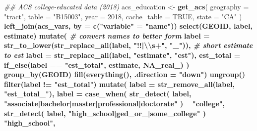 \documentclass[
]{article}
\newenvironment{Shaded}{\begin{snugshade}}{\end{snugshade}}
\newcommand{\CharTok}[1]{\textcolor[rgb]{0.31,0.60,0.02}{#1}}
\newcommand{\CommentTok}[1]{\textcolor[rgb]{0.56,0.35,0.01}{\textit{#1}}}
\newcommand{\DataTypeTok}[1]{\textcolor[rgb]{0.13,0.29,0.53}{#1}}
\newcommand{\DecValTok}[1]{\textcolor[rgb]{0.00,0.00,0.81}{#1}}
\newcommand{\KeywordTok}[1]{\textcolor[rgb]{0.13,0.29,0.53}{\textbf{#1}}}
\newcommand{\NormalTok}[1]{#1}
\newcommand{\OperatorTok}[1]{\textcolor[rgb]{0.81,0.36,0.00}{\textbf{#1}}}
\newcommand{\OtherTok}[1]{\textcolor[rgb]{0.56,0.35,0.01}{#1}}
\newcommand{\StringTok}[1]{\textcolor[rgb]{0.31,0.60,0.02}{#1}}
\begin{document}
\begin{Shaded}
\begin{Highlighting}[]
{{{{{{{{{{{{{{{{{{{{{{{{{{{{{{{{{{{{{{{{{{{{{{{{\CommentTok{## ACS college-educated data (2018)}
\NormalTok{acs_education <-}
\StringTok{  }\KeywordTok{get_acs}\NormalTok{(}
    \DataTypeTok{geography =} \StringTok{"tract"}\NormalTok{,}
    \DataTypeTok{table =} \StringTok{"B15003"}\NormalTok{,}
    \DataTypeTok{year =} \DecValTok{2018}\NormalTok{,}
    \DataTypeTok{cache_table =} \OtherTok{TRUE}\NormalTok{,}
    \DataTypeTok{state =} \StringTok{"CA"}
\NormalTok{  ) }\OperatorTok{%>%}
\StringTok{  }\KeywordTok{left_join}\NormalTok{(acs_vars, }\DataTypeTok{by =} \KeywordTok{c}\NormalTok{(}\StringTok{"variable"}\NormalTok{ =}\StringTok{ "name"}\NormalTok{)) }\OperatorTok{%>%}
\StringTok{  }\KeywordTok{select}\NormalTok{(GEOID, label, estimate) }\OperatorTok{%>%}
\StringTok{  }\KeywordTok{mutate}\NormalTok{(}
    \CommentTok{# convert names to better form}
    \DataTypeTok{label =} \KeywordTok{str_to_lower}\NormalTok{(}\KeywordTok{str_replace_all}\NormalTok{(label, }\StringTok{"!!|}\CharTok{\textbackslash{}\textbackslash{}}\StringTok{s+"}\NormalTok{, }\StringTok{"_"}\NormalTok{)),}
    \CommentTok{# short estimate to est}
    \DataTypeTok{label =} \KeywordTok{str_replace_all}\NormalTok{(label, }\StringTok{"estimate"}\NormalTok{, }\StringTok{"est"}\NormalTok{),}
    \DataTypeTok{est_total =} \KeywordTok{if_else}\NormalTok{(label }\OperatorTok{==}\StringTok{ "est_total"}\NormalTok{, estimate, }\OtherTok{NA_real_}\NormalTok{)}
\NormalTok{  ) }\OperatorTok{%>%}
\StringTok{  }\KeywordTok{group_by}\NormalTok{(GEOID) }\OperatorTok{%>%}
\StringTok{  }\KeywordTok{fill}\NormalTok{(}\KeywordTok{everything}\NormalTok{(), }\DataTypeTok{.direction =} \StringTok{"down"}\NormalTok{) }\OperatorTok{%>%}
\StringTok{  }\KeywordTok{ungroup}\NormalTok{() }\OperatorTok{%>%}
\StringTok{  }\KeywordTok{filter}\NormalTok{(label }\OperatorTok{!=}\StringTok{ "est_total"}\NormalTok{) }\OperatorTok{%>%}
\StringTok{  }\KeywordTok{mutate}\NormalTok{(}
    \DataTypeTok{label =} \KeywordTok{str_remove_all}\NormalTok{(label, }\StringTok{"est_total_"}\NormalTok{),}
    \DataTypeTok{label =}
      \KeywordTok{case_when}\NormalTok{(}
        \KeywordTok{str_detect}\NormalTok{(}
\NormalTok{          label, }\StringTok{"associate|bachelor|master|professional|doctorate"}
\NormalTok{        )                                                           }\OperatorTok{~}\StringTok{ "college"}\NormalTok{,}
        \KeywordTok{str_detect}\NormalTok{(}
\NormalTok{          label, }\StringTok{"high_school|ged_or_|some_college"}
\NormalTok{        )                                                       }\OperatorTok{~}\StringTok{ "high_school"}\NormalTok{,}
}}}}}}}}}}}}}}}}}}}}}}}}}}}}}}}}}}}}}}}}}}}}}}}}}}}}}}}}
\end{Highlighting}
\end{Shaded}
\end{document}
